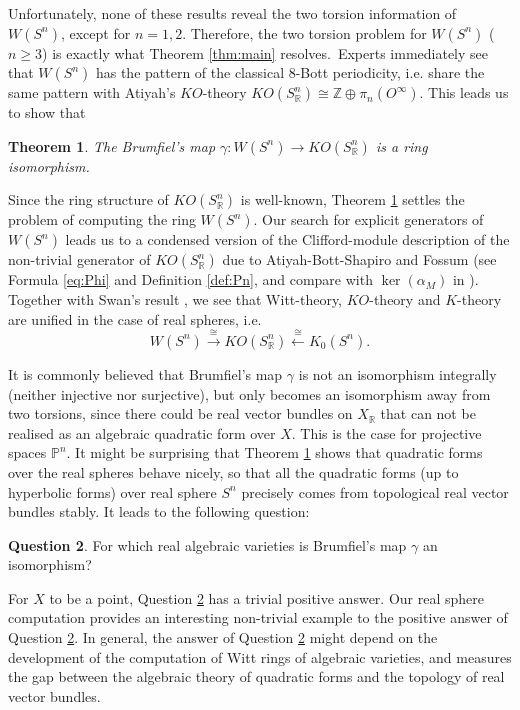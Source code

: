 \documentclass[psamsfonts]{amsart}
\theoremstyle{plain}
\newtheorem{theo}{Theorem}[section]
\theoremstyle{theorem}
\theoremstyle{definition}
\newtheorem{question}[theo]{\bf Question}
\newcommand{\R}{\mathbb{R}}
\newcommand{\W}{W}
\begin{document}
			  Unfortunately, none of these results reveal the two torsion information of $\W(S^n)$, except for $n = 1,2$. Therefore, the two torsion problem for $\W(S^n)$ ($n\geq 3$) is exactly what Theorem \ref{thm:main} resolves.\ Experts immediately see that $\W(S^n)$ has the pattern of the classical 8-Bott periodicity, i.e. share the same pattern with Atiyah's $KO$-theory $KO(S^n_\R) \cong \mathbb{Z} \oplus \pi_n(O^\infty)$. This leads us to show that 
			   					
\begin{theo}\label{thm:solution-to-Knebusch}
The Brumfiel's map $\gamma: \W(S^n) \to KO(S^n_\R)$ is a ring isomorphism. 
\end{theo}
Since the ring structure of $KO(S^n_\R)$ is well-known, Theorem \ref{thm:solution-to-Knebusch} settles the problem of computing the ring $\W(S^n)$. 
 Our search for explicit generators of $W(S^n)$ leads us to  a condensed version of  the Clifford-module description of the non-trivial generator of $KO(S^n_\R)$ due to Atiyah-Bott-Shapiro \cite{ABS63} and Fossum \cite{Fossum69} (see Formula \eqref{eq:Phi} and Definition \ref{def:Pn}, and compare with $\ker(\alpha_M)$ in \cite{Fossum69}). 
Together with Swan's result \cite[Theorem 3]{Swan}, we see that Witt-theory, $KO$-theory and $K$-theory are unified in the case of real spheres, i.e.
\[ \W(S^n)  \xrightarrow{\cong} KO(S^{n}_\R) \xleftarrow{\cong}  K_0(S^n). \]

It is commonly believed that Brumfiel's map $\gamma$ is not an isomorphism integrally (neither injective nor surjective), but only becomes an isomorphism away from two torsions, since there could be real vector bundles on $X_\R$ that can not be realised as an algebraic quadratic form over $X$. This is the case for projective spaces $\mathbb{P}^n$. It might be surprising that Theorem \ref{thm:solution-to-Knebusch} shows that quadratic forms over the real spheres behave nicely, so that all the quadratic forms (up to hyperbolic forms) over real sphere $S^n$ precisely comes from topological real vector bundles stably. It leads to the following question:
\begin{question}\label{ques:Brumfiel}
For which real algebraic varieties is Brumfiel's map $\gamma$ an  isomorphism?
\end{question}
For $X$ to be a point, Question \ref{ques:Brumfiel} has a trivial positive answer. Our real sphere computation provides an interesting non-trivial example to the positive answer of Question \ref{ques:Brumfiel}. In general, the answer of Question \ref{ques:Brumfiel} might depend on the development of the computation of Witt rings of algebraic varieties, and measures the gap between the algebraic theory of quadratic forms and the topology of real vector bundles. 
\end{document}
